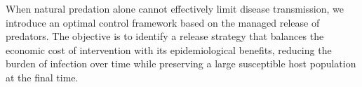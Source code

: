 \documentclass{amsart}
\theoremstyle{definition}
\theoremstyle{remark}
\numberwithin{equation}{section}
\begin{document}


When natural predation alone cannot effectively limit disease transmission, we introduce an optimal control framework based on the managed release of predators. The objective is to identify a release strategy that balances the economic cost of intervention with its epidemiological benefits, reducing the burden of infection over time while preserving a large susceptible host population at the final time.
\end{document}
